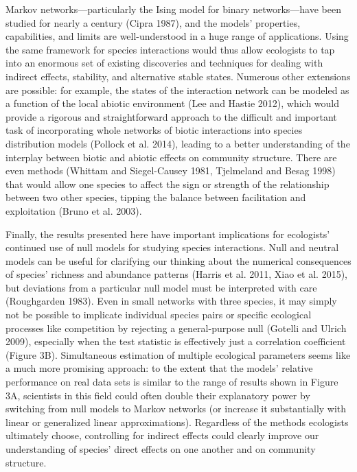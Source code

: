 \documentclass[12pt,]{article}
\begin{document}
\begin{spacing}{1.9}
\begin{flushleft}
Markov networks---particularly the Ising model for binary
networks---have been studied for nearly a century (Cipra 1987), and the
models' properties, capabilities, and limits are well-understood in a
huge range of applications. Using the same framework for species
interactions would thus allow ecologists to tap into an enormous set of
existing discoveries and techniques for dealing with indirect effects,
stability, and alternative stable states. Numerous other extensions are
possible: for example, the states of the interaction network can be
modeled as a function of the local abiotic environment (Lee and Hastie
2012), which would provide a rigorous and straightforward approach to
the difficult and important task of incorporating whole networks of
biotic interactions into species distribution models (Pollock et al.
2014), leading to a better understanding of the interplay between biotic
and abiotic effects on community structure. There are even methods
(Whittam and Siegel-Causey 1981, Tjelmeland and Besag 1998) that would
allow one species to affect the sign or strength of the relationship
between two other species, tipping the balance between facilitation and
exploitation (Bruno et al. 2003).

Finally, the results presented here have important implications for
ecologists' continued use of null models for studying species
interactions. Null and neutral models can be useful for clarifying our
thinking about the numerical consequences of species' richness and
abundance patterns (Harris et al. 2011, Xiao et al. 2015), but
deviations from a particular null model must be interpreted with care
(Roughgarden 1983). Even in small networks with three species, it may
simply not be possible to implicate individual species pairs or specific
ecological processes like competition by rejecting a general-purpose
null (Gotelli and Ulrich 2009), especially when the test statistic is
effectively just a correlation coefficient (Figure 3B). Simultaneous
estimation of multiple ecological parameters seems like a much more
promising approach: to the extent that the models' relative performance
on real data sets is similar to the range of results shown in Figure 3A,
scientists in this field could often double their explanatory power by
switching from null models to Markov networks (or increase it
substantially with linear or generalized linear approximations).
Regardless of the methods ecologists ultimately choose, controlling for
indirect effects could clearly improve our understanding of species'
direct effects on one another and on community structure.


\end{flushleft}
\end{spacing}
\end{document}
